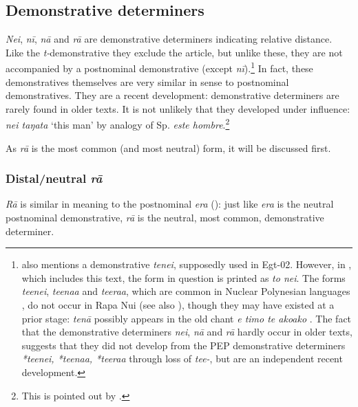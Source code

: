 \subsection{Demonstrative determiners}\label{sec:4.6.4}
\textit{Nei}, \textit{nī}, \textit{nā} and \textit{rā} are demonstrative determiners indicating relative distance. Like the \textit{t-}demonstrative they exclude the article, but unlike these, they are not accompanied by a postnominal demonstrative (except \textit{nī}).\footnote{\label{fn:223}\citet[8]{Chapin1974} also mentions a demonstrative \textit{tenei}, supposedly used in Egt-02. However, in \citet{Englert1974}, which includes this text, the form in question is printed as \textit{to nei}. The forms \textit{teenei}, \textit{teenaa} and \textit{teeraa}, which are common in Nuclear Polynesian languages \citep[51]{Pawley1966}, do not occur in Rapa Nui (see also \citealt[21]{LangdonTryon1983}), though they may have existed at a prior stage: \textit{tenā} possibly appears in the old chant \textit{e timo te akoako} \citep[426]{Fischer1994}. The fact that the demonstrative determiners \textit{nei}, \textit{nā} and \textit{rā} hardly occur in older texts, suggests that they did not develop from the PEP demonstrative determiners \textit{*teenei, *teenaa, *teeraa} through loss of \textit{tee-}, but are an independent recent development.} In fact, these demonstratives themselves are very similar in sense to postnominal demonstratives. They are a recent development: demonstrative determiners are rarely found in older texts. It is not unlikely that they developed under  influence: \textit{nei taŋata} ‘this man’ by analogy of Sp. \textit{este hombre}.\footnote{\label{fn:224}This is pointed out by \citet[389]{Fischer2007}.}

As \textit{rā} is the most common (and most neutral) form, it will be discussed first.

\subsubsection[Distal/neutral rā]{Distal/neutral \textit{rā}}\label{sec:4.6.4.1}

\textit{Rā} is similar in meaning to the postnominal \textit{era} (): just like \textit{era} is the neutral postnominal demonstrative, \textit{rā} is the neutral, most common, demonstrative determiner. 

